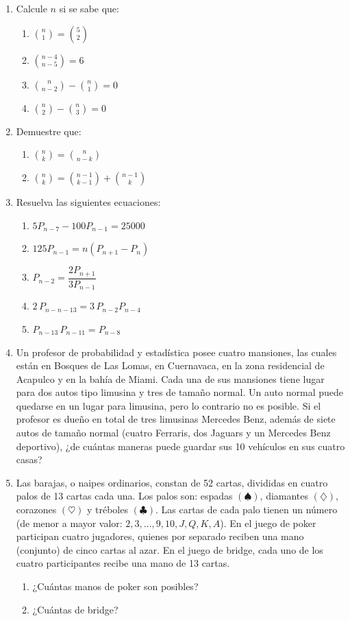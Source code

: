 \begin{Ejer}
\begin{enumerate}


\item Calcule $n$ si se sabe que:
\begin{enumerate}
\item $\binom{n}{1} = \binom{5}{2}$
\item $\binom{n-4}{n-5} = 6$
\item $\binom{n}{n-2} - \binom{n}{1} = 0$
\item $\binom{n}{2} - \binom{n}{3} = 0$
\end{enumerate}

\item Demuestre que:
\begin{enumerate}
\item $\binom{n}{k} = \binom{n}{n-k}$
\item $\binom{n}{k} = \binom{n-1}{k-1} + \binom{n-1}{k}$
\end{enumerate}

\item Resuelva las siguientes ecuaciones:
\begin{enumerate}
\item $5P_{n-7} - 100P_{n-1} = 25000$
\item $125P_{n-1} = n(P_{n+1} - P_n)$
\item $P_{n-2} = \dfrac{2P_{n+1}}{3P_{n-1}}$
\item $2\,P_{n-n-13} = 3\,P_{n-2}P_{n-4}$
\item $P_{n-13}\,P_{n-11} = P_{n-8}$
\end{enumerate}

\item Un profesor de probabilidad y estad\'istica posee cuatro mansiones, las cuales est\'an en Bosques de Las Lomas, en Cuernavaca, en la zona residencial de Acapulco y en la bah\'ia de Miami. Cada una de sus mansiones tiene lugar para dos autos tipo limusina y tres de tama\~no normal. Un auto normal puede quedarse en un lugar para limusina, pero lo contrario no es posible. Si el profesor es due\~no en total de tres limusinas Mercedes Benz, adem\'as de siete autos de tama\~no normal (cuatro Ferraris, dos Jaguars y un Mercedes Benz deportivo), ¿de cu\'antas maneras puede guardar sus 10 veh\'iculos en sus cuatro casas?

\item Las barajas, o naipes ordinarios, constan de 52 cartas, divididas en cuatro palos de 13 cartas cada una. Los palos son: espadas $(\spadesuit)$, diamantes $(\diamondsuit)$, corazones $(\heartsuit)$ y tr\'eboles $(\clubsuit)$. Las cartas de cada palo tienen un n\'umero (de menor a mayor valor: $2,3,\dots,9,10,J,Q,K,A$). En el juego de poker participan cuatro jugadores, quienes por separado reciben una mano (conjunto) de cinco cartas al azar. En el juego de bridge, cada uno de los cuatro participantes recibe una mano de 13 cartas.
\begin{enumerate}
\item ¿Cu\'antas manos de poker son posibles?
\item ¿Cu\'antas de bridge?
\end{enumerate}



\end{enumerate}
\end{Ejer}
